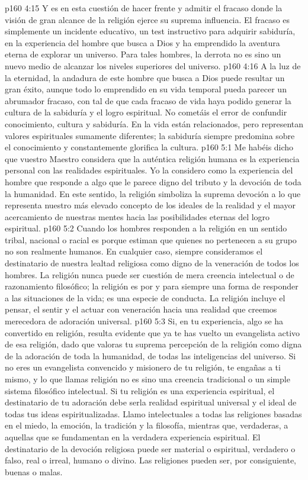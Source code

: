\vs p160 4:15 Y es en esta cuestión de hacer frente y admitir el fracaso donde la visión de gran alcance de la religión ejerce su suprema influencia. El fracaso es simplemente un incidente educativo, un test instructivo para adquirir sabiduría, en la experiencia del hombre que busca a Dios y ha emprendido la aventura eterna de explorar un universo. Para tales hombres, la derrota no es sino un nuevo medio de alcanzar los niveles superiores del universo.
\vs p160 4:16 A la luz de la eternidad, la andadura de este hombre que busca a Dios puede resultar un gran éxito, aunque todo lo emprendido en su vida temporal pueda parecer un abrumador fracaso, con tal de que cada fracaso de vida haya podido generar la cultura de la sabiduría y el logro espiritual. No cometáis el error de confundir conocimiento, cultura y sabiduría. En la vida están relacionados, pero representan valores espirituales sumamente diferentes; la sabiduría siempre predomina sobre el conocimiento y constantemente glorifica la cultura.
\vs p160 5:1 Me habéis dicho que vuestro Maestro considera que la auténtica religión humana es la experiencia personal con las realidades espirituales. Yo la considero como la experiencia del hombre que responde a algo que le parece digno del tributo y la devoción de toda la humanidad. En este sentido, la religión simboliza la suprema devoción a lo que representa nuestro más elevado concepto de los ideales de la realidad y el mayor acercamiento de nuestras mentes hacia las posibilidades eternas del logro espiritual.
\vs p160 5:2 Cuando los hombres responden a la religión en un sentido tribal, nacional o racial es porque estiman que quienes no pertenecen a su grupo no son realmente humanos. En cualquier caso, siempre consideramos el destinatario de nuestra lealtad religiosa como digno de la veneración de todos los hombres. La religión nunca puede ser cuestión de mera creencia intelectual o de razonamiento filosófico; la religión es por y para siempre una forma de responder a las situaciones de la vida; es una especie de conducta. La religión incluye el pensar, el sentir y el actuar con veneración hacia una realidad que creemos merecedora de adoración universal.
\vs p160 5:3 Si, en tu experiencia, algo se ha convertido en religión, resulta evidente que ya te has vuelto un evangelista activo de esa religión, dado que valoras tu suprema percepción de la religión como digna de la adoración de toda la humanidad, de todas las inteligencias del universo. Si no eres un evangelista convencido y misionero de tu religión, te engañas a ti mismo, y lo que llamas religión no es sino una creencia tradicional o un simple sistema filosófico intelectual. Si tu religión es una experiencia espiritual, el destinatario de tu adoración debe serla realidad espiritual universal y el ideal de todas tus ideas espiritualizadas. Llamo intelectuales a todas las religiones basadas en el miedo, la emoción, la tradición y la filosofía, mientras que, verdaderas, a aquellas que se fundamentan en la verdadera experiencia espiritual. El destinatario de la devoción religiosa puede ser material o espiritual, verdadero o falso, real o irreal, humano o divino. Las religiones pueden ser, por consiguiente, buenas o malas.
